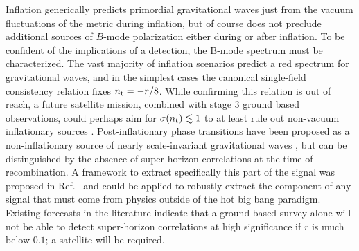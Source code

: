 Inflation generically predicts primordial gravitational waves just from the vacuum fluctuations of the metric during inflation, but of course does not preclude additional sources of $B$-mode polarization either during or after inflation. To be confident of the implications of a detection, the B-mode spectrum must be characterized. 
The vast majority of inflation scenarios predict a red spectrum for gravitational waves, and in the simplest cases the canonical single-field consistency relation fixes $n_{\rm t}=-r/8$. While confirming this relation is out of reach, a future satellite mission, combined with stage 3 ground based observations, could perhaps aim for $\sigma(n_{\rm t})\lesssim1$ to at least rule out non-vacuum inflationary sources  \cite{Namba:2015gja,Peloso:2016gqs}. Post-inflationary phase transitions have been proposed as a non-inflationary source of nearly scale-invariant gravitational waves \cite{Krauss:1991qu,JonesSmith:2007ne,Giblin:2011yh,Figueroa:2012kw,Fenu:2013tea}, but can be distinguished by the absence of super-horizon correlations at the time of recombination. A framework to extract specifically this part of the signal was proposed in Ref.~\cite{Baumann:2009mq} and could be applied to robustly extract the component of any signal that must come from physics outside of the hot big bang paradigm. Existing forecasts in the literature \cite{Lee:2014cya} indicate that a ground-based survey alone will not be able to detect super-horizon correlations at high significance if $r$ is much below $0.1$; a satellite will be required.

